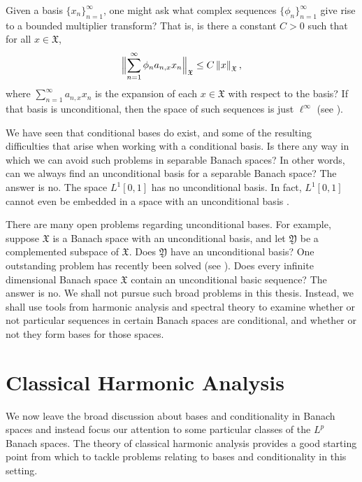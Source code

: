 \documentclass[12pt]{UNSWthesis}
\newcommand{\X}{\mathfrak{X}}
\newcommand{\Y}{\mathfrak{Y}}
\def\norm#1{\left \Vert #1 \right \Vert}
\def\snorm#1{\Bigl \Vert #1 \Bigr \Vert}
\numberwithin{equation}{section}
\begin{document}
Given a basis $\{x_n\}_{n=1}^{\infty}$, one might ask what
complex sequences $\{\phi_n\}_{n=1}^{\infty}$ give rise to a bounded multiplier
transform? That is, is there a constant $C>0$ such that for all $x\in\X$,
\[\snorm{\sum_{n=1}^{\infty}\phi_na_{n,x}x_n}_{\X}\leq C\norm{x}_{\X},\]
where $\sum_{n=1}^{\infty}a_{n,x}x_n$ is the expansion of each $x\in\X$ with
respect to the basis? If that basis is unconditional, then the space of such
sequences is just $\ell^{\infty}$ (see \cite[Proposition 1.c.7]{Lind}).


We have seen that conditional bases do exist, and some of the resulting
difficulties that arise when working with a conditional basis. Is there any way
in which we can avoid such problems in separable Banach spaces? In other words,
can we always find an unconditional
basis for a separable Banach space? The answer is no. The space $L^1[0,1]$ has
no unconditional basis. In fact, $L^1[0,1]$ cannot even be embedded in a space
with an unconditional basis \cite[Propostion 1.d.1]{Lind}.

There are many open problems regarding unconditional bases. For example,
suppose $\X$ is a Banach space with an unconditional basis, and let $\Y$ be
a complemented subspace of $\X$. Does $\Y$ have an unconditional basis? One
outstanding problem has recently been solved (see \cite{Gowers}).
Does every infinite dimensional Banach space $\X$ contain an unconditional
basic sequence? The answer is no.
We shall not pursue such broad problems in this thesis. Instead, we shall use 
tools from harmonic analysis and spectral theory to examine whether or not
particular sequences in certain Banach spaces are conditional, and whether or 
not
they form bases for those spaces.






\chapter{Classical Harmonic Analysis}\label{cha}





We now
leave the broad discussion about bases and conditionality in Banach spaces and
instead focus our attention to some particular classes of the $L^p$ Banach
spaces. The theory of classical harmonic analysis provides a good starting point
from which to tackle problems relating to bases and conditionality in this 
setting.
\end{document}
